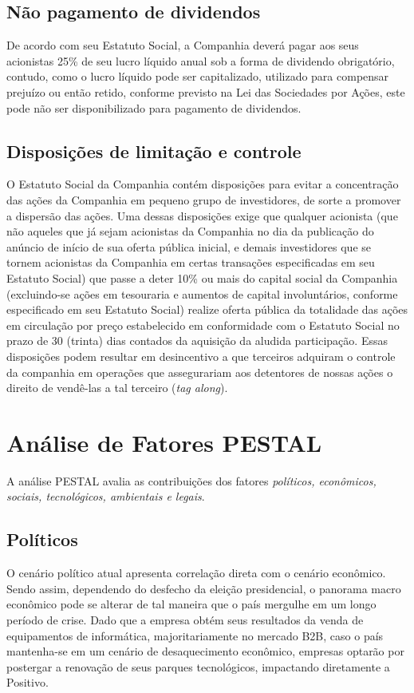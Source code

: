 {{{\subsection{Não pagamento de dividendos}
De acordo com seu Estatuto Social, a Companhia deverá pagar aos seus acionistas 25\% de seu lucro líquido anual sob a forma de dividendo obrigatório, contudo, como o lucro líquido pode ser capitalizado, utilizado para compensar prejuízo ou então retido, conforme previsto na Lei das Sociedades por Ações, este pode não ser disponibilizado para pagamento de dividendos.

\subsection{Disposições de limitação e controle}
O Estatuto Social da Companhia contém disposições para evitar a concentração das ações da Companhia em pequeno grupo de investidores, de sorte a promover a dispersão das ações. Uma dessas disposições exige que qualquer acionista (que não aqueles que já sejam acionistas da Companhia no dia da publicação do anúncio de início de sua oferta pública inicial, e demais investidores que se tornem acionistas da Companhia em certas transações especificadas em seu Estatuto Social) que passe a deter 10\% ou mais do capital social da Companhia (excluindo-se ações em tesouraria e aumentos de capital involuntários, conforme especificado em seu Estatuto Social) realize oferta pública da totalidade das ações em circulação por preço estabelecido em conformidade com o Estatuto Social no prazo de 30 (trinta) dias contados da aquisição da aludida participação. Essas disposições podem resultar em desincentivo a que terceiros adquiram o controle da companhia em operações que assegurariam aos detentores de nossas ações o direito de vendê-las a tal terceiro (\emph{tag along}).

\section{Análise de Fatores PESTAL}

A análise PESTAL avalia as contribuições dos fatores \emph{políticos, econômicos, sociais, tecnológicos, ambientais e legais}.

\subsection{Políticos}
O cenário político atual apresenta correlação direta com o cenário econômico. Sendo assim, dependendo do desfecho da eleição presidencial, o panorama macro econômico pode se alterar de tal maneira que o país mergulhe em um longo período de crise. Dado que a empresa obtém seus resultados da venda de equipamentos de informática, majoritariamente no mercado B2B, caso o país mantenha-se em um cenário de desaquecimento econômico, empresas optarão por postergar a renovação de seus parques tecnológicos, impactando diretamente a Positivo.

}}}
